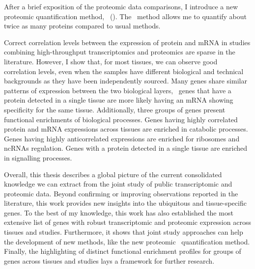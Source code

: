 \begin{singlespace}
{    After a brief exposition of the proteomic data comparisons,
    I introduce a new proteomic quantification method,
    \PPKM\ ().
    The \PPKM\ method allows me to quantify about twice as many proteins
    compared to usual methods.\mybr\

    Correct correlation levels
    between the expression of protein and mRNA
    in studies combining high-throughput transcriptomics and proteomics
    are sparse in the literature.
    However, I show that, for most tissues,
    we can observe good correlation levels,
    even when the samples have different biological and technical backgrounds
    as they have been independently sourced.
    Many genes share similar patterns of expression
    between the two biological layers,
    \eg\ genes that have a protein detected in a single tissue
    are more likely having an mRNA showing specificity for the same tissue.
    Additionally, three groups of genes present functional enrichments
    of biological processes.
    Genes having highly correlated protein and mRNA expressions across tissues
    are enriched in catabolic processes.
    Genes having highly anticorrelated expressions are enriched
    for ribosomes and ncRNAs regulation.
    Genes with a protein detected in a single tissue are enriched
    in signalling processes.\mybr\

    Overall, this thesis describes a global picture
    of the current consolidated knowledge
    we can extract from the joint study
    of public transcriptomic and proteomic data.
    Beyond confirming or improving observations reported in the literature,
    this work provides new insights
    into the ubiquitous and tissue-specific genes.
    To the best of my knowledge,
    this work has also established the most extensive list of genes
    with robust transcriptomic and proteomic expression across tissues and studies.
    Furthermore, it shows that joint study approaches can help the development
    of new methods, like the new proteomic \PPKM\ quantification method.
    Finally, the highlighting of distinct functional enrichment profiles
    for groups of genes across tissues and studies
    lays a framework for further research.\mybr\
    }
\end{singlespace}
